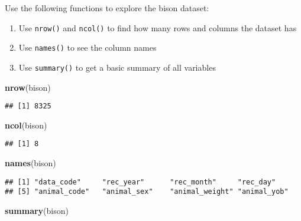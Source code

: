 \documentclass[
]{article}
\newenvironment{Shaded}{\begin{snugshade}}{\end{snugshade}}
\newcommand{\FunctionTok}[1]{\textcolor[rgb]{0.13,0.29,0.53}{\textbf{#1}}}
\newcommand{\NormalTok}[1]{#1}
\providecommand{\tightlist}{%
  \setlength{\itemsep}{0pt}\setlength{\parskip}{0pt}}
\begin{document}
Use the following functions to explore the bison dataset:

\begin{enumerate}
\def\labelenumi{\alph{enumi})}
\tightlist
\item
  Use \texttt{nrow()} and \texttt{ncol()} to find how many rows and
  columns the dataset has
\item
  Use \texttt{names()} to see the column names
\item
  Use \texttt{summary()} to get a basic summary of all variables
\end{enumerate}

\begin{Shaded}
\begin{Highlighting}[]
\FunctionTok{nrow}\NormalTok{(bison)}
\end{Highlighting}
\end{Shaded}

\begin{verbatim}
## [1] 8325
\end{verbatim}

\begin{Shaded}
\begin{Highlighting}[]
\FunctionTok{ncol}\NormalTok{(bison)}
\end{Highlighting}
\end{Shaded}

\begin{verbatim}
## [1] 8
\end{verbatim}

\begin{Shaded}
\begin{Highlighting}[]
\FunctionTok{names}\NormalTok{(bison)}
\end{Highlighting}
\end{Shaded}

\begin{verbatim}
## [1] "data_code"     "rec_year"      "rec_month"     "rec_day"      
## [5] "animal_code"   "animal_sex"    "animal_weight" "animal_yob"
\end{verbatim}

\begin{Shaded}
\begin{Highlighting}[]
\FunctionTok{summary}\NormalTok{(bison)}
\end{Highlighting}
\end{Shaded}
\end{document}
